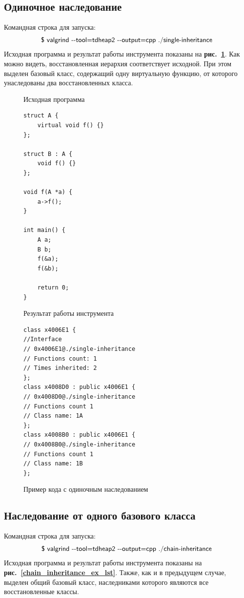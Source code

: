 \documentclass[a4paper,12pt,russian]{article}
\newcommand{\picref}[1]{\textbf{рис.~\ref{#1}}}
\newcommand{\code}[1]{\textsf{#1}}
\begin{document}
\subsection{Одиночное наследование}
Командная строка для запуска:
\[\mbox{\code{\$ valgrind -{}-tool=tdheap2 -{}-output=cpp ./single-inheritance}}\]
Исходная программа и результат работы инструмента показаны на \picref{single_inheritance_ex_lst}.
Как можно видеть, восстановленная иерархия соответствует исходной.
При этом выделен базовый класс, содержащий одну виртуальную функцию, от которого унаследованы два восстановленных класса.

\begin{figure}[h!]
\begin{minipage}[t]{0.45\linewidth}
\caption*{Исходная программа}
\begin{lstlisting}
struct A {
    virtual void f() {}
};

struct B : A {
    void f() {}
};

void f(A *a) {
    a->f();
}

int main() {
    A a;
    B b;
    f(&a);
    f(&b);

    return 0;
}
\end{lstlisting}
\end{minipage}
\begin{minipage}[t]{0.5\linewidth}
\caption*{Результат работы инструмента}
\begin{lstlisting}
class x4006E1 {
//Interface
// 0x4006E1@./single-inheritance
// Functions count: 1
// Times inherited: 2
};
class x4008D0 : public x4006E1 {
// 0x4008D0@./single-inheritance
// Functions count 1
// Class name: 1A
};
class x4008B0 : public x4006E1 {
// 0x4008B0@./single-inheritance
// Functions count 1
// Class name: 1B
};
\end{lstlisting}
\end{minipage}
\caption{Пример кода с одиночным наследованием}
\label{single_inheritance_ex_lst}
\end{figure}

\subsection{Наследование от одного базового класса}
Командная строка для запуска:
\[\mbox{\code{\$ valgrind -{}-tool=tdheap2 -{}-output=cpp ./chain-inheritance}}\]
Исходная программа и результат работы инструмента показаны на \picref{chain_inheritance_ex_lst}.
Также, как и в предыдущем случае, выделен общий базовый класс, наследниками которого являются все восстановленные классы.
\end{document}
